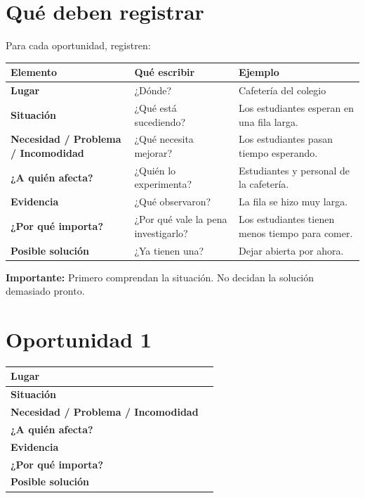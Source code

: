 \documentclass[12pt,a4paper]{article}
\begin{document}
	\newpage
	
	\section*{Qué deben registrar}
	
	Para cada oportunidad, registren:
	
	\begin{center}
		\small
		\begin{tabular}{|L{0.20\textwidth}|L{0.26\textwidth}|L{0.38\textwidth}|}
			\hline
			\textbf{Elemento} & \textbf{Qué escribir} & \textbf{Ejemplo} \\
			\hline
			\textbf{Lugar} & ¿Dónde? & Cafetería del colegio \\
			\hline
			\textbf{Situación} & ¿Qué está sucediendo? & Los estudiantes esperan en una fila larga. \\
			\hline
			\textbf{Necesidad / Problema / Incomodidad} & ¿Qué necesita mejorar? & Los estudiantes pasan tiempo esperando. \\
			\hline
			\textbf{¿A quién afecta?} & ¿Quién lo experimenta? & Estudiantes y personal de la cafetería. \\
			\hline
			\textbf{Evidencia} & ¿Qué observaron? & La fila se hizo muy larga. \\
			\hline
			\textbf{¿Por qué importa?} & ¿Por qué vale la pena investigarlo? & Los estudiantes tienen menos tiempo para comer. \\
			\hline
			\textbf{Posible solución} & ¿Ya tienen una? & Dejar abierta por ahora. \\
			\hline
		\end{tabular}
	\end{center}
	
	\textbf{Importante:} Primero comprendan la situación. No decidan la solución demasiado pronto.
	
	\section*{Oportunidad 1}
	
	\begin{center}
		\small
		\begin{tabular}{|L{0.22\textwidth}|L{0.61\textwidth}|}
			\hline
			\textbf{Lugar} & \rule{0pt}{0.5cm} \\
			\hline
			\textbf{Situación} & \rule{0pt}{0.5cm} \\
			\hline
			\textbf{Necesidad / Problema / Incomodidad} & \rule{0pt}{0.5cm} \\
			\hline
			\textbf{¿A quién afecta?} & \rule{0pt}{0.45cm} \\
			\hline
			\textbf{Evidencia} & \rule{0pt}{0.6cm} \\
			\hline
			\textbf{¿Por qué importa?} & \rule{0pt}{0.5cm} \\
			\hline
			\textbf{Posible solución} & \rule{0pt}{0.45cm} \\
			\hline
		\end{tabular}
	\end{center}
	
\end{document}
